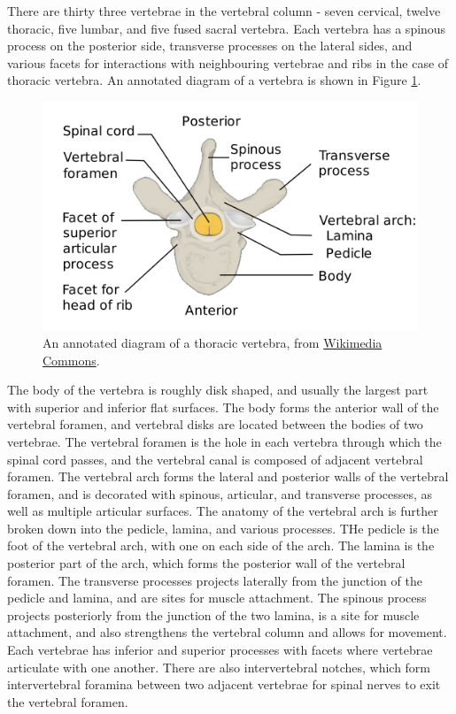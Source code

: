 \documentclass[11pt,titlepage]{article} %
\begin{document}
There are thirty three vertebrae in the vertebral column - seven cervical, twelve thoracic, five lumbar, and five fused sacral vertebra. Each vertebra has a spinous process on the posterior side, transverse processes on the lateral sides, and various facets for interactions with neighbouring vertebrae and ribs in the case of thoracic vertebra. An annotated diagram of a vertebra is shown in Figure \ref{vertebra}.
\begin{figure}[H]\label{vertebra}
\centering
\includegraphics[scale=0.25]{vertebrae}
\caption{An annotated diagram of a thoracic vertebra, from \href{https://commons.wikimedia.org/wiki/File:Vertebra_Superior_View-en.svg}{Wikimedia Commons}.} 
\end{figure}

The body of the vertebra is roughly disk shaped, and usually the largest part with superior and inferior flat surfaces. The body forms the anterior wall of the vertebral foramen, and vertebral disks are located between the bodies of two vertebrae. The vertebral foramen is the hole in each vertebra through which the spinal cord passes, and the vertebral canal is composed of adjacent vertebral foramen. The vertebral arch forms the lateral and posterior walls of the vertebral foramen, and is decorated with spinous, articular, and transverse processes, as well as multiple articular surfaces. The anatomy of the vertebral arch is further broken down into the pedicle, lamina, and various processes. THe pedicle is the foot of the vertebral arch, with one on each side of the arch. The lamina is the posterior part of the arch, which forms the posterior wall of the vertebral foramen. The transverse processes projects laterally from the junction of the pedicle and lamina, and are sites for muscle attachment. The spinous process projects posteriorly from the junction of the two lamina, is a site for muscle attachment, and also strengthens the vertebral column and allows for movement. Each vertebrae has inferior and superior processes with facets where vertebrae articulate with one another. There are also intervertebral notches, which form intervertebral foramina between two adjacent vertebrae for spinal nerves to exit the vertebral foramen.
\end{document}
